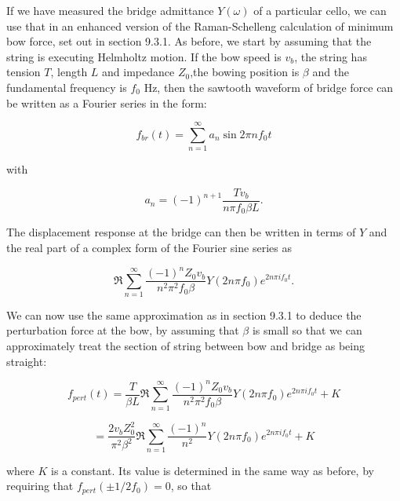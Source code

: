   If we have measured the bridge admittance $Y(\omega)$ of a particular cello, 
  we can use that in an enhanced version of the Raman-Schelleng calculation of 
  minimum bow force, set out in section 9.3.1. As before, we start by assuming 
  that the string is executing Helmholtz motion. If the bow speed is $v_b$, the 
  string has tension $T$, length $L$ and impedance $Z_0$,the bowing position is 
  $\beta$ and the fundamental frequency is $f_0$ Hz, then the sawtooth waveform 
  of bridge force can be written as a Fourier series in the form: 

  \begin{equation*}f_{br}(t)=\sum_{n=1}^\infty{a_n \sin 2 \pi n f_0 t} 
  \tag{1}\end{equation*} 

  \noindent{}with 

  \begin{equation*}a_n = (-1)^{n+1} \dfrac{Tv_b}{n \pi f_0 \beta L} . 
  \tag{2}\end{equation*} 

  The displacement response at the bridge can then be written in terms of $Y$ 
  and the real part of a complex form of the Fourier sine series as 

  \begin{equation*}\Re \sum_{n=1}^\infty{\dfrac{(-1)^n Z_0v_b}{n^2 \pi^2 f_0 
  \beta} Y(2 n \pi f_0) e^{2n \pi i f_0 t}} . \tag{3}\end{equation*} 

  We can now use the same approximation as in section 9.3.1 to deduce the 
  perturbation force at the bow, by assuming that $\beta$ is small so that we 
  can approximately treat the section of string between bow and bridge as being 
  straight: 

  \begin{equation*}f_{pert}(t)=\dfrac{T}{\beta L}\Re 
  \sum_{n=1}^\infty{\dfrac{(-1)^n Z_0v_b}{n^2 \pi^2 f_0 \beta} Y(2 n \pi f_0) 
  e^{2n \pi i f_0 t}} + K\end{equation*} 

  \begin{equation*}=\dfrac{2 v_b Z^2_0}{\pi^2 \beta^2}\Re 
  \sum_{n=1}^\infty{\dfrac{(-1)^n }{n^2} Y(2 n \pi f_0) e^{2n \pi i f_0 t}} + K 
  \tag{4}\end{equation*} 

  \noindent{}where $K$ is a constant. Its value is determined in the same way 
  as before, by requiring that $f_{pert}(\pm 1/2f_0)=0$, so that 

